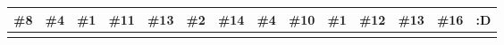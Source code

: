 \documentclass[12pt]{article}
\begin{document}
\noindent
\begin{tabular}{|*{14}{W|}} 
\hline
\textbf{\#8} & \textbf{\#4} & \textbf{\#1} & \textbf{\#11} & 
\textbf{\#13} & \textbf{\#2} & \textbf{\#14} & \textbf{\#4} & 
\textbf{\#10} & \textbf{\#1} & \textbf{\#12} & 
\textbf{\#13} & \textbf{\#16} & \textbf{:D} \\
\hline
& & & & & & & & & & & & & \\
\hline
\end{tabular}
\begin{comment}
\section*{Line Table Key}
\noindent %
\begin{tabular}{|*{14}{W|}} 
\hline
\textbf{\#7} & \textbf{\#9} & \textbf{\#1} & \textbf{\#2} & 
\textbf{\#10} & \textbf{\#2} & \textbf{\#3} & \textbf{\#9} & 
\textbf{\#5} & \textbf{\#6} & \textbf{\#2} & 
\textbf{\#12} & \textbf{\#15} & \textbf{\#20} \\

\hline
\textbf{C} & \textbf{A} & \textbf{N} & \textbf{\_} & 
\textbf{I} & \textbf{\_} & \textbf{H} & \textbf{A} & 
\textbf{V} & \textbf{E} & \textbf{\_} &
\textbf{T} & \textbf{W} & \textbf{O} \\
\hline
\end{tabular}

\vspace{1em} %

\noindent
\begin{tabular}{|*{14}{W|}} 
\hline
\textbf{\#8} & \textbf{\#4} & \textbf{\#1} & \textbf{\#11} & 
\textbf{\#13} & \textbf{\#2} & \textbf{\#14} & \textbf{\#4} & 
\textbf{\#10} & \textbf{\#1} & \textbf{\#12} & 
\textbf{\#13} & \textbf{\#16} & \textbf{:D} \\
\hline
\textbf{B} & \textbf{O} & \textbf{N} & \textbf{U} & 
\textbf{S} & \textbf{\_} & \textbf{P} & \textbf{O} & 
\textbf{I} & \textbf{N} & \textbf{T} & 
\textbf{S} & \textbf{?} & \textbf{:D} \\
\hline
\end{tabular}
\end{comment}
\vspace{10cm}
\end{document}
